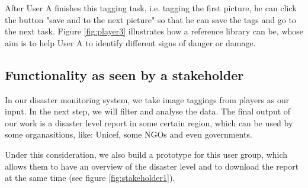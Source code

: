       After User A finishes this tagging task,
      i.e.
      tagging the first picture,
      he can click the button "save and to the next picture" so that he can save the tags and go to the next task.
      Figure \ref{fig:player3} illustrates how a reference library can be,
      whose aim is to help User A to identify different signs of danger or damage.

    \subsection{Functionality as seen by a stakeholder}
      In our disaster monitoring system, 
      we take image taggings from players as our input. 
      In the next step, 
      we will filter and analyse the data.
      The final output of our work is a disaster level report in some certain region,
      which can be used by some organasitions,
      like: Unicef, some NGOs and even governments.

      Under this consideration, 
      we also build a prototype for this user group,
      which allows them to have an overview of the disaster level and to download the report at the same time (see figure \ref{fig:stakeholder1}).

